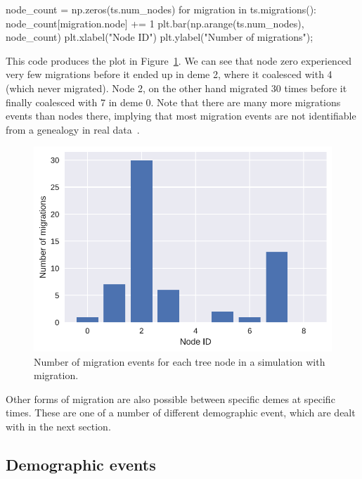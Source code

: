 \documentclass[graybox]{svmult}
\begin{document}
\begin{pythoncode}
node_count = np.zeros(ts.num_nodes)
for migration in ts.migrations():
    node_count[migration.node] += 1
plt.bar(np.arange(ts.num_nodes), node_count)
plt.xlabel("Node ID")
plt.ylabel("Number of migrations");
\end{pythoncode}

This code produces the plot in Figure~\ref{fig:migration_counts}.
We can see that node zero experienced very few migrations before it
ended up in deme 2, where it coalesced with 4 (which never migrated).
Node 2, on the other hand migrated 30 times before it finally coalesced
with 7 in deme 0. Note that there are many more migrations events than
nodes there, implying that most migration events are not identifiable
from a genealogy in real data~\citep{sousa2011nonidentifiability}.

\begin{figure}
\begin{center}
\includegraphics[width=\textwidth]{images/simulations_30_0.pdf}
\end{center}
\caption{\label{fig:migration_counts} Number of migration events for
each tree node in a simulation with migration.}
\end{figure}

Other forms of migration are also possible between specific demes at
specific times. These are one of a number of different demographic
event, which are dealt with in the next section.

\subsection{Demographic events}\label{demographic-events}
\end{document}
